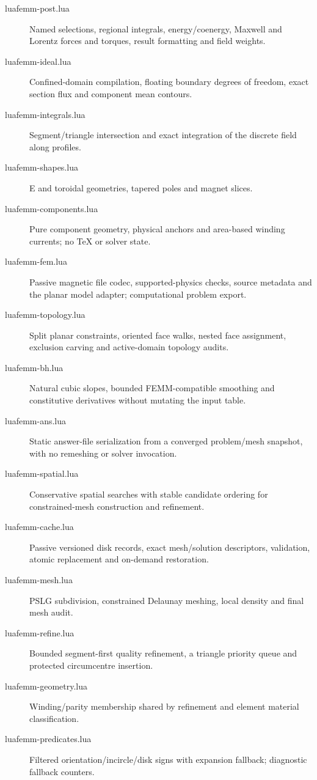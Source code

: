 \begin{description}
\item[luafemm-post.lua] Named selections, regional integrals, energy/coenergy,
  Maxwell and Lorentz forces and torques, result formatting and field weights.
\item[luafemm-ideal.lua] Confined-domain compilation, floating boundary
  degrees of freedom, exact section flux and component mean contours.
\item[luafemm-integrals.lua] Segment/triangle intersection and exact integration
  of the discrete field along profiles.
\item[luafemm-shapes.lua] E and toroidal geometries, tapered poles and magnet slices.
\item[luafemm-components.lua] Pure component geometry, physical anchors and
  area-based winding currents; no TeX or solver state.
\item[luafemm-fem.lua] Passive magnetic file codec, supported-physics checks,
  source metadata and the planar model adapter; computational problem export.
\item[luafemm-topology.lua] Split planar constraints, oriented face walks,
  nested face assignment, exclusion carving and active-domain topology audits.
\item[luafemm-bh.lua] Natural cubic slopes, bounded FEMM-compatible smoothing
  and constitutive derivatives without mutating the input table.
\item[luafemm-ans.lua] Static answer-file serialization from a converged
  problem/mesh snapshot, with no remeshing or solver invocation.
\item[luafemm-spatial.lua] Conservative spatial searches with stable candidate
ordering for constrained-mesh construction and refinement.
\item[luafemm-cache.lua] Passive versioned disk records, exact mesh/solution
  descriptors, validation, atomic replacement and on-demand restoration.
\item[luafemm-mesh.lua] PSLG subdivision, constrained Delaunay meshing,
  local density and final mesh audit.
\item[luafemm-refine.lua] Bounded segment-first quality refinement, a triangle
  priority queue and protected circumcentre insertion.
\item[luafemm-geometry.lua] Winding/parity membership shared by refinement
  and element material classification.
\item[luafemm-predicates.lua] Filtered orientation/incircle/disk signs with
  expansion fallback; diagnostic fallback counters.

\end{description}
